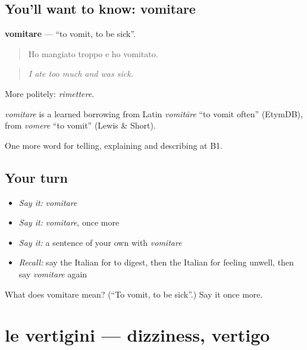\subsection*{You'll want to know: vomitare}
\textbf{vomitare} — \textquotedblleft{}to vomit, to be sick\textquotedblright{}.

\begin{quote}
Ho mangiato troppo e ho vomitato.
\end{quote}

\begin{quote}
\emph{I ate too much and was sick.}
\end{quote}

More politely: \emph{rimettere}.

\begin{cousinweb}
\emph{vomitare} is a learned borrowing from Latin \emph{vomitāre} \textquotedblleft{}to vomit often\textquotedblright{} (EtymDB), from \emph{vomere} \textquotedblleft{}to vomit\textquotedblright{} (Lewis \& Short).
\end{cousinweb}

\begin{grammarlens}[title={What you've built}]
One more word for telling, explaining and describing at B1.
\end{grammarlens}

\subsection*{Your turn}
\begin{itemize}
\raggedright
  \item \emph{Say it:} \emph{vomitare}
  \item \emph{Say it:} \emph{vomitare}, once more
  \item \emph{Say it:} a sentence of your own with \emph{vomitare}
  \item \emph{Recall:} say the Italian for to digest, then the Italian for feeling unwell, then say \emph{vomitare} again
\end{itemize}

\begin{tcolorbox}[breakable,colback=teal!4,colframe=teal!35!black,title={Before you move on}]
What does vomitare mean? (\textquotedblleft{}To vomit, to be sick\textquotedblright{}.) Say it once more.
\end{tcolorbox}
\section[le vertigini]{le vertigini — dizziness, vertigo}

